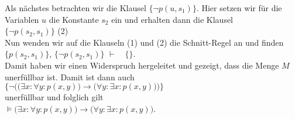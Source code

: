 Als nächstes betrachten wir die Klausel $\big\{\neg p(u,s_1)\big\}$.
Hier setzen wir für die Variablen $u$ die Konstante $s_2$ ein und erhalten dann die
Klausel \\[0.2cm]
\hspace*{1.3cm} $\big\{\neg p(s_2,s_1)\big\}$ \hspace*{\fill} (2) \\[0.2cm]
Nun wenden wir auf die Klauseln (1) und (2) die Schnitt-Regel an und finden \\[0.2cm]
\hspace*{1.3cm} 
$\big\{ p(s_2,s_1) \big\}$, \quad$\big\{\neg p(s_2,s_1)\big\}$ \quad $\vdash \quad \{\}$.
\\[0.2cm]
Damit haben wir einen Widerspruch hergeleitet und gezeigt, dass die Menge $M$ unerfüllbar
ist. Damit ist dann auch \\[0.2cm]
\hspace*{1.3cm} 
$\Big\{ \neg \Big(\big(\exists x\colon \forall y\colon  p(x,y)\big) \rightarrow  \big(\forall y\colon \exists x\colon p(x,y)\big)\Big)\Big\}$
\\[0.2cm]
unerfüllbar und folglich gilt \\[0.2cm]
\hspace*{1.3cm} 
$\models \big(\exists x\colon \forall y\colon  p(x,y)\big) \rightarrow  \big(\forall y\colon \exists x\colon p(x,y)\big)$.

